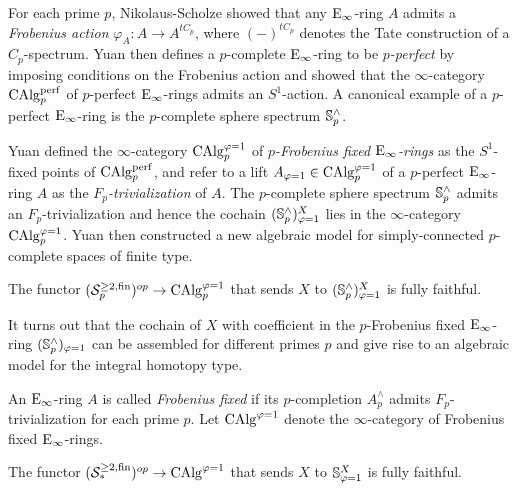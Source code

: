 For each prime $p$, Nikolaus-Scholze \cite{Nikolaus-Scholze} showed that any $\operatorname{E}_{\infty}$-ring $A$ admits a \emph{Frobenius action} $\varphi_{A}:A \to A^{tC_{p}}$, where $(-)^{tC_p}$ denotes the Tate construction of a $C_p$-spectrum.
Yuan \cite{Yuan} then defines a $p$-complete $\operatorname{E}_\infty$-ring to be \emph{$p$-perfect} by imposing conditions on the Frobenius action and showed that the $\infty$-category $\operatorname{CAlg}_p^{\operatorname{perf}}$ of $p$-perfect $\operatorname{E}_\infty$-rings
admits an $S^1$-action.
A canonical example of a $p$-perfect $\operatorname{E}_{\infty}$-ring is the $p$-complete sphere spectrum ${\mathbb{S}}^{\wedge}_p$.

Yuan defined the $\infty$-category $\operatorname{CAlg}_{p}^{\varphi=1}$ of \emph{$p$-Frobenius fixed $\operatorname{E}_{\infty}$-rings} as the $S^1$-fixed points of $\operatorname{CAlg}_p^{\operatorname{perf}}$, and refer to a lift $A_{\varphi=1}\in \operatorname{CAlg}_{p}^{\varphi=1}$ of a
$p$-perfect $\operatorname{E}_{\infty}$-ring $A$ as the \emph{$F_p$-trivialization} of $A$.
The $p$-complete sphere spectrum ${\mathbb{S}}^{\wedge}_p$ admits an $F_p$-trivialization and hence the cochain $({\mathbb{S}}^{\wedge}_{p})_{\varphi=1}^{X}$ lies in the $\infty$-category $\operatorname{CAlg}_{p}^{\varphi=1} $.
Yuan then constructed a new algebraic model for simply-connected $p$-complete spaces of finite type.
\begin{theorem}
    \cite[Theorem B]{Yuan}
    The functor $
    ({\mathcal{S}}^{\geq 2, \operatorname{fin}}_p)^{op} 
    \to 
    \operatorname{CAlg}_{p}^{\varphi=1} 
    $ that sends $X$ to $({\mathbb{S}}^{\wedge}_{p})_{\varphi=1}^{X}$ is fully faithful.
\end{theorem}

It turns out that the cochain of $X$ with coefficient in the $p$-Frobenius fixed $\operatorname{E}_\infty$-ring $({\mathbb{S}}^{\wedge}_{p})_{\varphi=1}$ can be assembled for different primes $p$ and give rise to an algebraic model for the integral homotopy type.

An $\operatorname{E}_{\infty}$-ring $A$ is called \emph{Frobenius fixed} if its $p$-completion $A^{\wedge}_{p}$ admits $F_p$-trivialization for each prime $p$. Let $\operatorname{CAlg}^{\varphi=1}$ denote the $\infty$-category of Frobenius fixed $\operatorname{E}_\infty$-rings.
\begin{theorem}
    \cite[Theorem C]{Yuan}
    The functor $
    ({\mathcal{S}}_{*}^{\geq 2, \operatorname{fin}})^{op} 
    \to 
    \operatorname{CAlg}^{\varphi=1} 
    $ that sends $X$ to ${\mathbb{S}}_{\varphi=1}^{X}$ is fully faithful.
\end{theorem}

